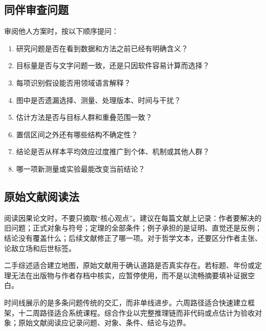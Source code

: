 \subsection{同伴审查问题}

审阅他人方案时，按以下顺序提问：

\begin{enumerate}
  \item 研究问题是否在看到数据和方法之前已经有明确含义？
  \item 目标量是否与文字问题一致，还是只因软件容易计算而选择？
  \item 每项识别假设能否用领域语言解释？
  \item 图中是否遗漏选择、测量、处理版本、时间与干扰？
  \item 估计方法是否与目标人群和重叠范围一致？
  \item 置信区间之外还有哪些结构不确定性？
  \item 结论是否从样本平均效应过度推广到个体、机制或其他人群？
  \item 哪一项新测量或实验最能改变当前结论？
\end{enumerate}

\subsection{原始文献阅读法}

阅读因果论文时，不要只摘取“核心观点”。建议在每篇文献上记录：作者要解决的旧问题；正式对象与符号；定理的全部条件；例子承担的是证明、直觉还是反例；结论没有覆盖什么；后续文献修正了哪一项。对于哲学文本，还要区分作者主张、论敌立场和后世标签。

二手综述适合建立地图，原始文献用于确认道路是否真实存在。若标题、年份或定理无法在出版物与作者存档中核实，应暂停使用，而不是以流畅摘要填补证据空白。

\begin{chapterreview}
时间线展示的是多条问题传统的交汇，而非单线进步。六周路径适合快速建立框架，十二周路径适合系统课程。综合作业以完整推理链而非代码或点估计为验收对象；原始文献阅读应记录问题、对象、条件、结论与边界。
\end{chapterreview}
